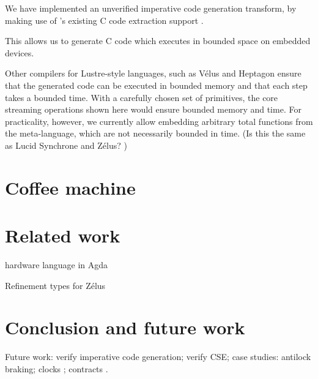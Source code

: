 \documentclass[sigplan,screen]{acmart}
\begin{document}
We have implemented an unverified imperative code generation transform, by making use of \fstar{}'s existing C code extraction support \cite{protzenko2017verified}.

This allows us to generate C code which executes in bounded space on embedded devices.

Other compilers for Lustre-style languages, such as Vélus \cite{bourke2017formally} and Heptagon \cite{gerard2012modular} ensure that the generated code can be executed in bounded memory and that each step takes a bounded time.
With a carefully chosen set of primitives, the core streaming operations shown here would ensure bounded memory and time.
For practicality, however, we currently allow embedding arbitrary total functions from the \fstar{} meta-language, which are not necessarily bounded in time.
(Is this the same as Lucid Synchrone and Zélus? \CITE)

\section{Coffee machine}
\label{s:coffee-machine}

\section{Related work}

hardware language in Agda \cite{harrison2021mechanized}

Refinement types for Zélus \cite{chen2022synchronous}



\section{Conclusion and future work}

Future work: verify imperative code generation; verify CSE; case studies: antilock braking; clocks \cite{caspi1995functional}; contracts \cite{champion2016kind2}.






\end{document}
